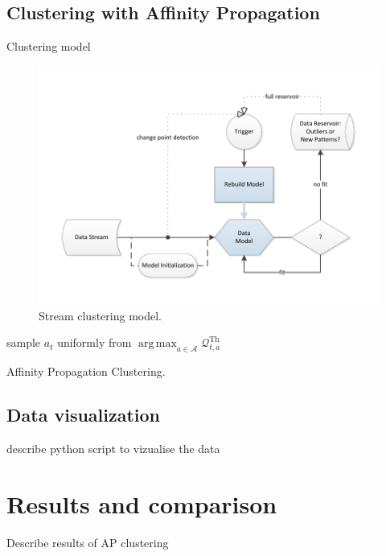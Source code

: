 \documentclass[11pt, letterpaper]{article}            %
\begin{document}
\subsection{Clustering with Affinity Propagation}
Clustering model~\citep{zhang2013data}\\
\begin{figure}[htbp]
	\centering
	\includegraphics[width=\textwidth]{./gfx/APC.pdf}
  \caption{Stream clustering model.\label{fig:APC}}
\end{figure}

\SetAlCapSkip{1em}
\LinesNumbered
\vspace{2cm}
\begin{algorithm}[h]
  sample $a_t$ uniformly from $\operatorname{arg\,max}_{a \in \mathscr{A}} 
\mathscr{Q}^\text{Th}_{t,a}$ \;
 \caption{Affinity Propagation Clustering.\label{alg:APC}}
\end{algorithm}
\vspace{2cm}

\subsection{Data visualization}
describe python script to vizualise the data\\


\section{Results and comparison}
Describe results of AP clustering
\end{document}
